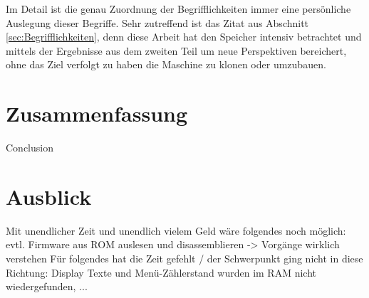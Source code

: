 Im Detail ist die genau Zuordnung der Begrifflichkeiten immer eine persönliche Auslegung dieser Begriffe.
Sehr zutreffend ist das Zitat aus Abschnitt \ref{sec:Begrifflichkeiten}, denn diese Arbeit hat den Speicher intensiv betrachtet und mittels der Ergebnisse aus dem zweiten Teil um neue Perspektiven bereichert, ohne das Ziel verfolgt zu haben die Maschine zu klonen oder umzubauen.

\section{Zusammenfassung}
Conclusion

\section{Ausblick}
Mit unendlicher Zeit und unendlich vielem Geld wäre folgendes noch möglich: evtl.
Firmware aus ROM auslesen und disassemblieren -> Vorgänge wirklich verstehen
Für folgendes hat die Zeit gefehlt / der Schwerpunkt ging nicht in diese Richtung: Display Texte und Menü-Zählerstand wurden im RAM nicht wiedergefunden, ...
